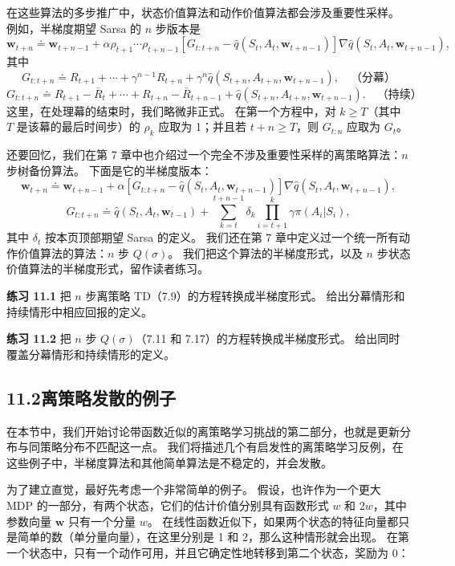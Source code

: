 \documentclass[UTF8, 12pt, fontset=fandol, oneside]{ctexart}
\begin{document}
在这些算法的多步推广中，状态价值算法和动作价值算法都会涉及重要性采样。
例如，半梯度期望 Sarsa 的 $n$ 步版本是
\begin{equation}
\mathbf{w}_{t+n}\doteq \mathbf{w}_{t+n-1}
+\alpha\rho_{t+1}\cdots\rho_{t+n-1}\left[G_{t:t+n}-\hat q(S_t,A_t,\mathbf{w}_{t+n-1})\right]\nabla\hat q(S_t,A_t,\mathbf{w}_{t+n-1}),
\tag{11.6}
\end{equation}
其中
\[
G_{t:t+n}\doteq R_{t+1}+\cdots+\gamma^{n-1}R_{t+n}
+\gamma^n\hat q(S_{t+n},A_{t+n},\mathbf{w}_{t+n-1}),\quad \text{（分幕）}
\]
\[
G_{t:t+n}\doteq R_{t+1}-\bar R_t+\cdots+R_{t+n}-\bar R_{t+n-1}
+\hat q(S_{t+n},A_{t+n},\mathbf{w}_{t+n-1}).\quad \text{（持续）}
\]
这里，在处理幕的结束时，我们略微非正式。
在第一个方程中，对 $k\ge T$（其中 $T$ 是该幕的最后时间步）的 $\rho_k$ 应取为 1；并且若 $t+n\ge T$，则 $G_{t:n}$ 应取为 $G_t$。

还要回忆，我们在第 7 章中也介绍过一个完全不涉及重要性采样的离策略算法：$n$ 步树备份算法。
下面是它的半梯度版本：
\begin{equation}
\mathbf{w}_{t+n}\doteq \mathbf{w}_{t+n-1}
+\alpha\left[G_{t:t+n}-\hat q(S_t,A_t,\mathbf{w}_{t+n-1})\right]\nabla\hat q(S_t,A_t,\mathbf{w}_{t+n-1}),
\tag{11.7}
\end{equation}
\begin{equation}
G_{t:t+n}\doteq \hat q(S_t,A_t,\mathbf{w}_{t-1})
+\sum_{k=t}^{t+n-1}\delta_k\prod_{i=t+1}^{k}\gamma\pi(A_i|S_i),
\tag{11.8}
\end{equation}
其中 $\delta_t$ 按本页顶部期望 Sarsa 的定义。
我们还在第 7 章中定义过一个统一所有动作价值算法的算法：$n$ 步 $Q(\sigma)$。
我们把这个算法的半梯度形式，以及 $n$ 步状态价值算法的半梯度形式，留作读者练习。

\noindent\textbf{练习 11.1}
把 $n$ 步离策略 TD（7.9）的方程转换成半梯度形式。
给出分幕情形和持续情形中相应回报的定义。

\noindent\textbf{练习 11.2}
把 $n$ 步 $Q(\sigma)$（7.11 和 7.17）的方程转换成半梯度形式。
给出同时覆盖分幕情形和持续情形的定义。

\subsection*{11.2\quad 离策略发散的例子}

在本节中，我们开始讨论带函数近似的离策略学习挑战的第二部分，也就是更新分布与同策略分布不匹配这一点。
我们将描述几个有启发性的离策略学习反例，在这些例子中，半梯度算法和其他简单算法是不稳定的，并会发散。

为了建立直觉，最好先考虑一个非常简单的例子。
假设，也许作为一个更大 MDP 的一部分，有两个状态，它们的估计价值分别具有函数形式 $w$ 和 $2w$，其中参数向量 $\mathbf{w}$ 只有一个分量 $w$。
在线性函数近似下，如果两个状态的特征向量都只是简单的数（单分量向量），在这里分别是 1 和 2，那么这种情形就会出现。
在第一个状态中，只有一个动作可用，并且它确定性地转移到第二个状态，奖励为 0：
\end{document}
